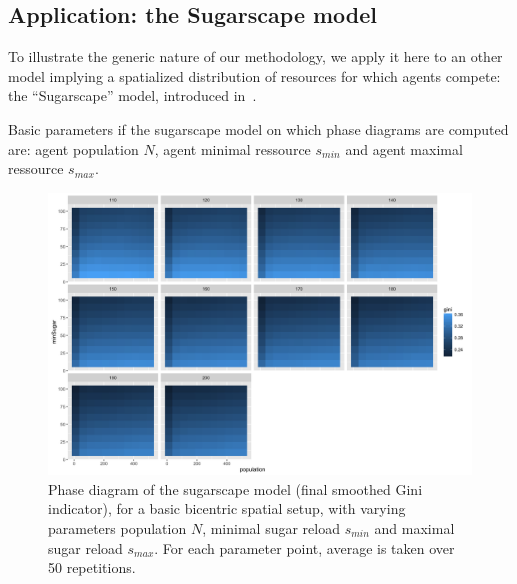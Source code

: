 \documentclass[a4paper,12pt]{article}
\begin{document}
\subsection{Application: the Sugarscape model}

To illustrate the generic nature of our methodology, we apply it here to an other model implying a spatialized distribution of resources for which agents compete: the ``Sugarscape'' model, introduced in~\cite{epstein1996growing}.

Basic parameters if the sugarscape model on which phase diagrams are computed are: agent population $N$, agent minimal ressource $s_{min}$ and agent maximal ressource $s_{max}$.


\begin{figure}
\centering
\includegraphics[width=\textwidth]{figures/fixed_phase_diagram}
\caption{Phase diagram of the sugarscape model (final smoothed Gini indicator), for a basic bicentric spatial setup, with varying parameters population $N$, minimal sugar reload $s_{min}$ and maximal sugar reload $s_{max}$. For each parameter point, average is taken over 50 repetitions.}
\label{fig:sugarscape-phasediagram}
\end{figure}
\end{document}
